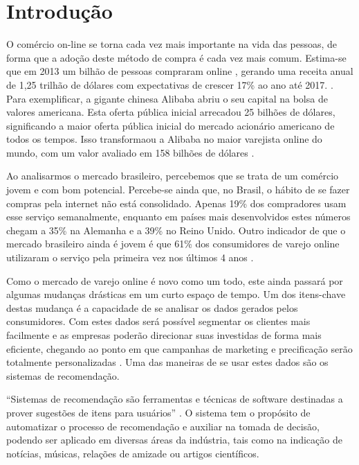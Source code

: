 \chapter[Introdução]{Introdução}
\label{chap:introducao}

O comércio on-line se torna cada vez mais importante na vida das pessoas, de forma que a adoção deste método de compra é cada vez mais comum. Estima-se que em 2013 um bilhão de pessoas compraram online \cite{emarketerB2CEcommerceClimbs}, gerando uma receita anual de 1,25 trilhão de dólares com expectativas de crescer 17\% ao ano até 2017. \cite{emarketerGlobalB2CSales}. Para exemplificar, a gigante chinesa Alibaba abriu o seu capital na bolsa de valores americana. Esta oferta pública inicial arrecadou 25 bilhões de dólares, significando a maior oferta pública inicial do mercado acionário americano de todos os tempos. Isso transformaou a Alibaba no maior varejista online do mundo, com um valor avaliado em 158 bilhões de dólares \cite{ForbesAlibabaBoostsIPO}.

Ao analisarmos o mercado brasileiro, percebemos que se trata de um comércio jovem e com bom potencial. Percebe-se ainda que, no Brasil, o hábito de se fazer compras pela internet não está consolidado. Apenas 19\% dos compradores usam esse serviço semanalmente, enquanto em países mais desenvolvidos estes números chegam a 35\% na Alemanha e a 39\% no Reino Unido. Outro indicador de que o mercado brasileiro ainda é jovem é que 61\% dos consumidores de varejo online utilizaram o serviço pela primeira vez nos últimos 4 anos \cite{PWCTotalRetail}.

Como o mercado de varejo online é novo como um todo, este ainda passará por algumas mudanças drásticas em um curto espaço de tempo. Um dos itens-chave destas mudança é a capacidade de se analisar os dados gerados pelos consumidores. Com estes dados será possível segmentar os clientes mais facilmente e as empresas poderão direcionar suas investidas de forma mais eficiente, chegando ao ponto em que campanhas de marketing e precificação serão totalmente personalizadas \cite{BCGThegotomarketrevolution}. Uma das maneiras de se usar estes dados são os sistemas de recomendação.

``Sistemas de recomendação são ferramentas e técnicas de software destinadas a prover sugestões de itens para usuários'' \cite{ricci2011introduction-chap1}. O sistema tem o propósito de automatizar o processo de recomendação e auxiliar na tomada de decisão, podendo ser aplicado em diversas áreas da indústria, tais como na indicação de notícias, músicas, relações de amizade ou artigos científicos.

